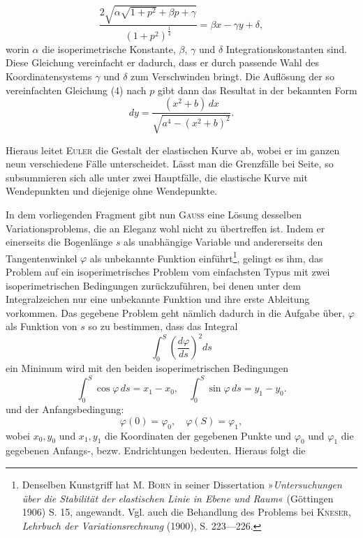 \begin{equation*}\tag{4}
\frac{2\sqrt{\alpha\sqrt{1+p^2}+\beta p+\gamma}}{(1+p^2)^{\frac14}}=\beta x-\gamma y+\delta,
\end{equation*}
worin $\alpha$ die isoperimetrische Konstante, $\beta$, $\gamma$ und $\delta$ Integrationskonstanten sind.
Diese Gleichung vereinfacht er dadurch, dass er durch passende Wahl des
Koordinatensystems $\gamma$ und $\delta$ zum Verschwinden bringt. Die Auflösung der
so vereinfachten Gleichung (4) nach $p$ gibt dann das Resultat in der bekannten Form
\[
dy=\frac{(x^2+b)\,dx}{\sqrt{a^4-(x^2+b)^2}}.
\]
\par\noindent\hspace*{\parindent}Hieraus leitet \textsc{Euler} die Gestalt der elastischen Kurve ab, wobei er im
ganzen neun verschiedene Fälle unterscheidet. Lässt man die Grenzfälle bei
Seite, so subsummieren sich alle unter zwei Hauptfälle, die elastische Kurve
mit Wendepunkten und diejenige ohne Wendepunkte.
\par\noindent\hspace*{\parindent}In dem vorliegenden Fragment gibt nun \textsc{Gauss} eine Lösung desselben
Variationsproblems, die an Eleganz wohl nicht zu übertreffen ist. Indem er
\clearpage{}
\noindent einerseits die Bogenlänge $s$ als unabhängige Variable und andererseits den
Tangentenwinkel $\varphi$ als unbekannte Funktion einführt\footnote{Denselben Kunstgriff hat M. \textsc{Born} in seiner Dissertation »\textit{Untersuchungen über die Stabilität der
elastischen Linie in Ebene und Raum}« (Göttingen 1906) S. 15, angewandt. Vgl. auch die Behandlung des
Problems bei \textsc{Kneser}, \textit{Lehrbuch der Variationsrechnung} (1900), S. 223—226.}, gelingt es ihm, das
Problem auf ein isoperimetrisches Problem vom einfachsten Typus mit zwei
isoperimetrischen Bedingungen zurückzuführen, bei denen unter dem Integralzeichen nur eine unbekannte Funktion und ihre erste Ableitung vorkommen.
Das gegebene Problem geht nämlich dadurch in die Aufgabe über, $\varphi$ als
Funktion von $s$ so zu bestimmen, dass das Integral
\[
\int_0^S\left(\frac{d\varphi}{ds}\right)^2ds
\]
ein Minimum wird mit den beiden isoperimetrischen Bedingungen
\[
\int_0^S\cos\varphi\,ds=x_1-x_0,\quad\int_0^S\sin\varphi\,ds=y_1-y_0.
\]
und der Anfangsbedingung:
\[
\varphi(0)=\varphi_0,\quad\varphi(S)=\varphi_1,
\]
wobei $x_0,y_0$ und $x_1,y_1$ die Koordinaten der gegebenen Punkte und $\varphi_0$ und $\varphi_1$
die gegebenen Anfangs-, bezw. Endrichtungen bedeuten. Hieraus folgt die
